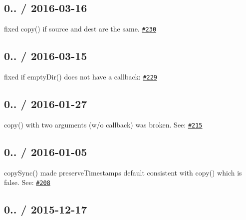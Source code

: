 \subsection*{0.. / 2016-\/03-\/16 }


\begin{DoxyItemize}
\item fixed {\ttfamily copy()} if source and dest are the same. \href{https://github.com/jprichardson/node-fs-extra/pull/230}{\tt \#230}
\end{DoxyItemize}

\subsection*{0.. / 2016-\/03-\/15 }


\begin{DoxyItemize}
\item fixed if {\ttfamily empty\+Dir()} does not have a callback\+: \href{https://github.com/jprichardson/node-fs-extra/pull/229}{\tt \#229}
\end{DoxyItemize}

\subsection*{0.. / 2016-\/01-\/27 }


\begin{DoxyItemize}
\item {\ttfamily copy()} with two arguments (w/o callback) was broken. See\+: \href{https://github.com/jprichardson/node-fs-extra/pull/215}{\tt \#215}
\end{DoxyItemize}

\subsection*{0.. / 2016-\/01-\/05 }


\begin{DoxyItemize}
\item {\ttfamily copy\+Sync()} made {\ttfamily preserve\+Timestamps} default consistent with {\ttfamily copy()} which is {\ttfamily false}. See\+: \href{https://github.com/jprichardson/node-fs-extra/pull/208}{\tt \#208}
\end{DoxyItemize}

\subsection*{0.. / 2015-\/12-\/17 }


